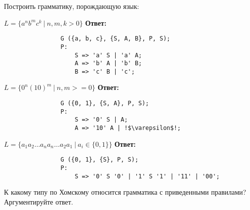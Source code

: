 \documentclass[]{article}
\begin{document}
\begin{enumerate}
\begin{item}
\begin{enumerate}
    \end{enumerate}
\end{item}

\begin{item}
    Построить грамматику, порождающую язык:
    \begin{enumerate}
    
        \begin{item}
            $L = \{ a^n b^m c^k\ |\  n, m, k > 0 \}$
            \bigbreak
            \textbf{Ответ:}
            \begin{lstlisting}
                G ({a, b, c}, {S, A, B}, P, S);
                P:
                    S => 'a' S | 'a' A;
                    A => 'b' A | 'b' B;
                    B => 'c' B | 'c';
            \end{lstlisting}
        \end{item}

        \begin{item}
            $L = \{ 0^n (10)^m \ |\  n, m >= 0 \}$
            \bigbreak
            \textbf{Ответ:}
            \begin{lstlisting}
                G ({0, 1}, {S, A}, P, S);
                P:
                    S => '0' S | A;
                    A => '10' A | !$\varepsilon$!;
            \end{lstlisting}
        \end{item}

        \begin{item}
            $L = \{ a_1 a_2 \dots a_n a_n \dots a_2 a_1 \ |\  a_i \in \{ 0, 1 \} \}$
            \bigbreak
            \textbf{Ответ:}
            \begin{lstlisting}
                G ({0, 1}, {S}, P, S);
                P:
                    S => '0' S '0' | '1' S '1' | '11' | '00';
            \end{lstlisting}
        \end{item}
    
    \end{enumerate}
\end{item}

\begin{item}
    К какому типу по Хомскому относится грамматика с приведенными правилами? Аргументируйте ответ.
    \begin{enumerate}
        

\end{enumerate}
\end{item}
\end{enumerate}
\end{document}
